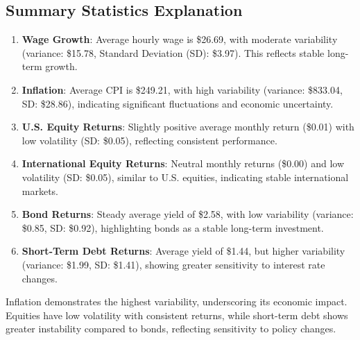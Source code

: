 \documentclass[
  letterpaper,
  DIV=11,
  numbers=noendperiod]{scrartcl}
\begin{document}
\subsection{Summary Statistics
Explanation}\label{summary-statistics-explanation}

\begin{enumerate}
\def\labelenumi{\arabic{enumi}.}
\item
  \textbf{Wage Growth}: Average hourly wage is \$26.69, with moderate
  variability (variance: \$15.78, Standard Deviation (SD): \$3.97). This
  reflects stable long-term growth.
\item
  \textbf{Inflation}: Average CPI is \$249.21, with high variability
  (variance: \$833.04, SD: \$28.86), indicating significant fluctuations
  and economic uncertainty.
\item
  \textbf{U.S. Equity Returns}: Slightly positive average monthly return
  (\$0.01) with low volatility (SD: \$0.05), reflecting consistent
  performance.
\item
  \textbf{International Equity Returns}: Neutral monthly returns
  (\$0.00) and low volatility (SD: \$0.05), similar to U.S. equities,
  indicating stable international markets.
\item
  \textbf{Bond Returns}: Steady average yield of \$2.58, with low
  variability (variance: \$0.85, SD: \$0.92), highlighting bonds as a
  stable long-term investment.
\item
  \textbf{Short-Term Debt Returns}: Average yield of \$1.44, but higher
  variability (variance: \$1.99, SD: \$1.41), showing greater
  sensitivity to interest rate changes.
\end{enumerate}

Inflation demonstrates the highest variability, underscoring its
economic impact. Equities have low volatility with consistent returns,
while short-term debt shows greater instability compared to bonds,
reflecting sensitivity to policy changes.
\end{document}
